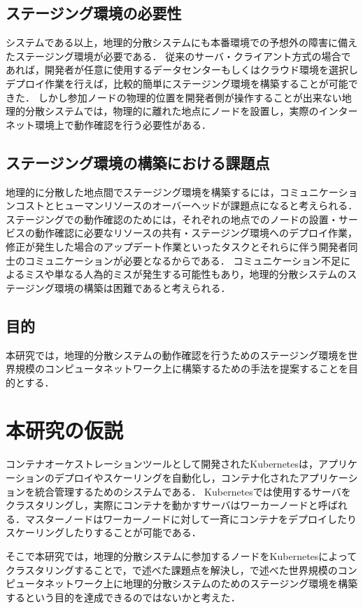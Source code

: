 \subsection{ステージング環境の必要性}
システムである以上，地理的分散システムにも本番環境での予想外の障害に備えたステージング環境が必要である．
従来のサーバ・クライアント方式の場合であれば，開発者が任意に使用するデータセンターもしくはクラウド環境を選択しデプロイ作業を行えば，比較的簡単にステージング環境を構築することが可能できた．
しかし参加ノードの物理的位置を開発者側が操作することが出来ない地理的分散システムでは，物理的に離れた地点にノードを設置し，実際のインターネット環境上で動作確認を行う必要性がある．

\subsection{ステージング環境の構築における課題点}
地理的に分散した地点間でステージング環境を構築するには，コミュニケーションコストとヒューマンリソースのオーバーヘッドが課題点になると考えられる．
ステージングでの動作確認のためには，それぞれの地点でのノードの設置・サービスの動作確認に必要なリソースの共有・ステージング環境へのデプロイ作業，修正が発生した場合のアップデート作業といったタスクとそれらに伴う開発者同士のコミュニケーションが必要となるからである．
コミュニケーション不足によるミスや単なる人為的ミスが発生する可能性もあり，地理的分散システムのステージング環境の構築は困難であると考えられる．

\subsection{目的}
本研究では，地理的分散システムの動作確認を行うためのステージング環境を世界規模のコンピュータネットワーク上に構築するための手法を提案することを目的とする．

\section{本研究の仮説}
\label{introduction:hypothesis}
コンテナオーケストレーションツールとして開発されたKubernetesは，アプリケーションのデプロイやスケーリングを自動化し，コンテナ化されたアプリケーションを統合管理するためのシステムである．
Kubernetesでは使用するサーバをクラスタリングし，実際にコンテナを動かすサーバはワーカーノードと呼ばれる．マスターノードはワーカーノードに対して一斉にコンテナをデプロイしたりスケーリングしたりすることが可能である．

そこで本研究では，地理的分散システムに参加するノードをKubernetesによってクラスタリングすることで，{}で述べた課題点を解決し，{}で述べた世界規模のコンピュータネットワーク上に地理的分散システムのためのステージング環境を構築するという目的を達成できるのではないかと考えた．

